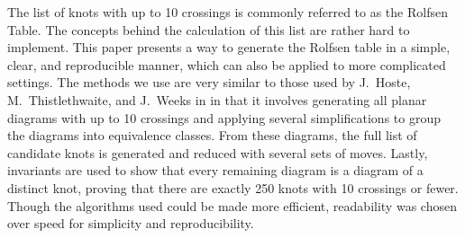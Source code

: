 
\code
\diagrams
\theorems

\begin{paperabs}
The list of knots with up to 10 crossings is commonly referred to as the Rolfsen
Table.
The concepts behind the calculation of this list are rather hard to implement.
This paper presents a way to generate the Rolfsen table in a simple, clear, and
reproducible manner, which can also be applied to more complicated settings.
The methods we use are very similar to those used by J.~Hoste,
M.~Thistlethwaite, and J.~Weeks in \cite{htw} in that it involves generating all
planar diagrams with up to 10 crossings and applying several simplifications to
group the diagrams into equivalence classes.
From these diagrams, the full list of candidate knots is generated and reduced
with several sets of moves.
Lastly, invariants are used to show that every remaining diagram is a diagram of
a distinct knot, proving that there are exactly 250 knots with 10 crossings or
fewer.
Though the algorithms used could be made more efficient, readability was chosen
over speed for simplicity and reproducibility.
\end{paperabs}
